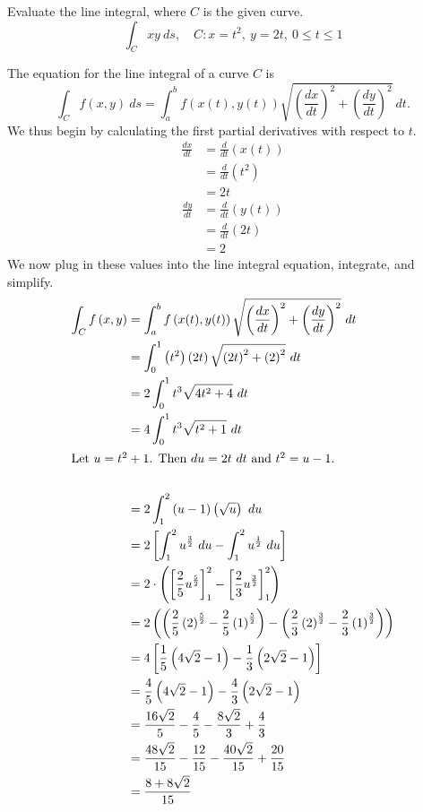 \begin{exercise}
	Evaluate the line integral, where $C$ is the given curve.
	\begin{equation*}
	\int_C xy \ ds, \quad C: x=t^2, \ y=2t, \ 0 \leq t \leq 1
	\end{equation*}
\end{exercise}
\begin{solution}
	The equation for the line integral of a curve $C$ is
	\begin{equation*}
	\int_C f\left(x,y\right) \ ds = \int_a^b f\left(x(t),y(t)\right)\sqrt{\left(\frac{dx}{dt}\right)^2+\left(\frac{dy}{dt}\right)^2}\ dt.
	\end{equation*}
	We thus begin by calculating the first partial derivatives with respect to $t$.
	\begin{align*}
	\frac{dx}{dt} &= \frac{d}{dt}\left(x(t)\right) \\
	&= \frac{d}{dt}\left(t^2\right)\\
	&= 2t
	\end{align*}
	\begin{align*}
	\frac{dy}{dt} &= \frac{d}{dt}\left(y(t)\right) \\
	&= \frac{d}{dt}\left(2t\right)\\
	&= 2
	\end{align*}
	We now plug in these values into the line integral equation, integrate, and simplify.
	\begin{align*}
	\int_C f\left(x,y\right) &= \int_a^b f\left(x(t),y(t)\right) \sqrt{ \left(\frac{dx}{dt}\right)^2 + \left(\frac{dy}{dt}\right)^2}\ dt \\
	&= \int_0^1 \left(t^2\right)\left(2t\right)\sqrt{\left(2t\right)^2+\left(2\right)^2}\ dt \\
	&= 2 \int_0^1 t^3 \sqrt{ 4t^2 + 4 }\ dt \\
	&= 4 \int_0^1 t^3 \sqrt{ t^2 + 1 }\ dt \\
	\intertext{Let $u = t^2 + 1$. Then $du = 2t\ dt$ and $t^2 = u - 1$.} \\
	&= 2 \int_1^2 \left( u - 1 \right)\left(\sqrt{u}\right)\ du \\
	&= 2 \left[ \int_1^2 u^{\frac{3}{2}}\ du - \int_1^2 u^{\frac{1}{2}}\ du \right] \\
	&= 2 \cdot \left( \left[ \frac{2}{5} u^{\frac{5}{2}} \right]_1^2 - \left[ \frac{2}{3} u^{\frac{3}{2}} \right]_1^2 \right) \\
	&= 2 \left( \left( \frac{2}{5} \left(2\right)^{\frac{5}{2}} - \frac{2}{5} \left(1\right)^{\frac{5}{2}} \right) - \left( \frac{2}{3} \left(2\right)^{\frac{3}{2}} - \frac{2}{3} \left(1\right)^{\frac{3}{2}} \right) \right) \\
	&= 4 \left[ \frac{1}{5} \left( 4\sqrt{2} - 1 \right) - \frac{1}{3} \left( 2\sqrt{2} - 1 \right) \right] \\
	&= \frac{4}{5}\left(4\sqrt{2} - 1\right) - \frac{4}{3}\left(2\sqrt{2} - 1\right) \\
	&= \frac{16\sqrt{2}}{5} - \frac{4}{5} - \frac{8\sqrt{2}}{3} + \frac{4}{3} \\
	&= \frac{48\sqrt{2}}{15} - \frac{12}{15} - \frac{40\sqrt{2}}{15} + \frac{20}{15} \\
	&= \frac{8+8\sqrt{2}}{15}
	\end{align*}
\end{solution}
